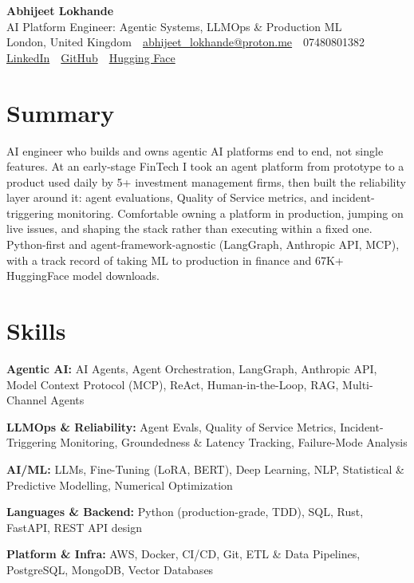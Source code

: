 \documentclass[10pt,a4paper]{article}
\newcommand{\sep}{\,\textcolor{accent!60}{\textbar}\,}
\begin{document}
\begin{center}
  {\fontsize{24}{26}\selectfont\bfseries Abhijeet Lokhande}\\[3pt]
  {\color{accent}\large AI Platform Engineer: Agentic Systems, LLMOps \& Production ML}\\[5pt]
  {\small
    London, United Kingdom \sep
    \href{mailto:abhijeet_lokhande@proton.me}{abhijeet\_lokhande@proton.me} \sep
    07480801382 \\[2pt]
    \href{https://www.linkedin.com/in/ablds/}{LinkedIn} \sep
    \href{https://github.com/abhijeetscode}{GitHub} \sep
    \href{https://huggingface.co/ab-ai}{Hugging Face}
  }
\end{center}
\vspace{2pt}

\section{Summary}
AI engineer who builds and owns agentic AI platforms end to end, not single features. At an early-stage FinTech I took an agent platform from prototype to a product used daily by 5+ investment management firms, then built the reliability layer around it: agent evaluations, Quality of Service metrics, and incident-triggering monitoring. Comfortable owning a platform in production, jumping on live issues, and shaping the stack rather than executing within a fixed one. Python-first and agent-framework-agnostic (LangGraph, Anthropic API, MCP), with a track record of taking ML to production in finance and 67K+ HuggingFace model downloads.

\section{Skills}
\begin{tight}
  \item[\textcolor{accent}{\small$\bullet$}] \textbf{Agentic AI:} AI Agents, Agent Orchestration, LangGraph, Anthropic API, Model Context Protocol (MCP), ReAct, Human-in-the-Loop, RAG, Multi-Channel Agents
  \item[\textcolor{accent}{\small$\bullet$}] \textbf{LLMOps \& Reliability:} Agent Evals, Quality of Service Metrics, Incident-Triggering Monitoring, Groundedness \& Latency Tracking, Failure-Mode Analysis
  \item[\textcolor{accent}{\small$\bullet$}] \textbf{AI/ML:} LLMs, Fine-Tuning (LoRA, BERT), Deep Learning, NLP, Statistical \& Predictive Modelling, Numerical Optimization
  \item[\textcolor{accent}{\small$\bullet$}] \textbf{Languages \& Backend:} Python (production-grade, TDD), SQL, Rust, FastAPI, REST API design
  \item[\textcolor{accent}{\small$\bullet$}] \textbf{Platform \& Infra:} AWS, Docker, CI/CD, Git, ETL \& Data Pipelines, PostgreSQL, MongoDB, Vector Databases
\end{tight}
\end{document}
